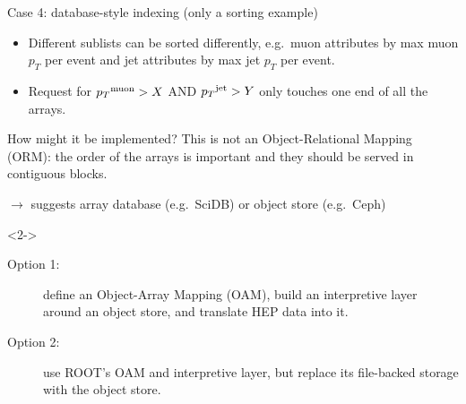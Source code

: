\documentclass[aspectratio=169]{beamer}
\begin{document}
\begin{frame}{Case 4: database-style indexing (only a sorting example)}
\vspace{0.25 cm}
\begin{itemize}
\item<2-> Different sublists can be sorted differently, e.g.\ muon attributes by max muon $p_T$ per event and jet attributes by max jet $p_T$ per event.
\item<3-> Request for ${p_T}^{\mbox{\scriptsize muon}} > X$ AND ${p_T}^{\mbox{\scriptsize jet}} > Y$ only touches one end of all the arrays.
\end{itemize}
\end{frame}

\begin{frame}{How might it be implemented?}
\vspace{0.5 cm}
This is not an Object-Relational Mapping (ORM): the order of the arrays is important and they should be served in contiguous blocks.
\begin{center}
$\to$ suggests array database (e.g.\ SciDB) or object store (e.g.\ Ceph)
\end{center}

\vspace{0.25 cm}
\begin{uncoverenv}<2->
\begin{description}
\item[Option 1:] define an Object-Array Mapping (OAM), build an interpretive layer around an object store, and translate HEP data into it.

\item[Option 2:] use ROOT's OAM and interpretive layer, but replace its file-backed storage with the object store.
\end{description}
\end{uncoverenv}

\vspace{0.5 cm}
\end{frame}
\end{document}
